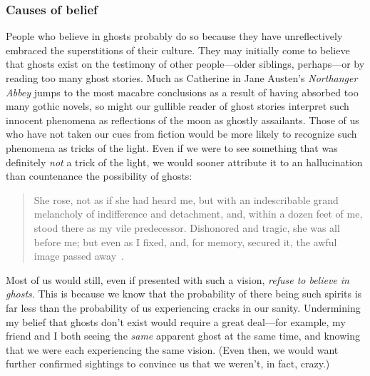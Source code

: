 \documentclass[11pt]{article}
\newenvironment{squote}{\begin{quote}\begin{singlespace}}{\end{singlespace}\end{quote}}
\begin{document}
\begin{spacing}{1.5}
\subsubsection{Causes of belief}
\label{unger-cause}
People who believe in ghosts probably do so because they have unreflectively embraced the superstitions of their culture. They may initially come to believe that ghosts exist on the testimony of other people---older siblings, perhaps---or by reading too many ghost stories. Much as Catherine in Jane Austen's {\em Northanger Abbey} jumps to the most macabre conclusions as a result of having absorbed too many gothic novels, so might our gullible reader of ghost stories interpret such innocent phenomena as reflections of the moon as ghostly assailants. Those of us who have not taken our cues from fiction would be more likely to recognize such phenomena as tricks of the light. Even if we were to see something that was definitely {\em not} a trick of the light, we would sooner attribute it to an hallucination than countenance the possibility of ghosts:
%
\begin{squote}
She rose, not as if she had heard me, but with an indescribable grand melancholy of indifference and detachment, and, within a dozen feet of me, stood there as my vile predecessor. Dishonored and tragic, she was all before me; but even as I fixed, and, for memory, secured it, the awful image passed away~\citep[58]{james1991}.
\end{squote}
%
Most of us would still, even if presented with such a vision, {\em refuse to believe in ghosts}. This is because we know that the probability of there being such spirits is far less than the probability of us experiencing cracks in our sanity. Undermining my belief that ghosts don't exist would require a great deal---for example, my friend and I both seeing the {\em same} apparent ghost at the same time, and knowing that we were each experiencing the same vision. (Even then, we would want further confirmed sightings to convince us that we weren't, in fact, crazy.)


\end{spacing}
\end{document}
